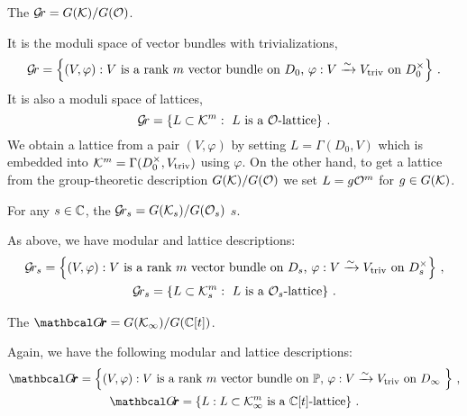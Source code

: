 \documentclass[draft]{article} %
\begin{document}
\begin{definition}
\label{def:gr}
     The  $\mathcal{G}\!r = G(\mathcal K)/G(\mathcal O)$.
\end{definition}    
It is the moduli space of vector bundles with trivializations,
$$
\mathcal{G}\!r = 
    \left\{ 
        (V, \varphi) : \text{$V$ is a rank $m$ vector bundle on $ D_0 $, $\varphi : V \xrightarrow{\sim} V_{\mathrm{triv}} $ on $ D_0^\times $} 
    \right\} \,. 
$$
It is also a moduli space of lattices, 
$$ 
\mathcal{G}\!r = 
    \left\{ L \subset \mathcal K^m : \text{ $L$ is a $\mathcal O$-lattice} \right\}\,.
$$
% 
We obtain a lattice from a pair $ (V,\varphi) $ by setting $ L = \Gamma(D_0, V)$ which is embedded into $ \mathcal K^m = \Gamma(D_0^\times, V_{\mathrm{triv}})$ using $ \varphi$.  
On the other hand, to get a lattice from the group-theoretic description $ G(\mathcal K) / G(\mathcal O) $ we set $ L = g \mathcal O^m$ for $ g \in G(\mathcal K)$.
% 
\begin{definition}
\label{def:grs}
 For any $ s \in \mathbb C $, 
    the  $\mathcal{G}\!r_s = G(\mathcal K_s)/G(\mathcal O_s)$  $ s $. 
\end{definition}    
As above, we have modular and lattice descriptions:
\begin{gather*}
\mathcal{G}\!r_s = 
    \left\{ (
        V, \varphi) : \text{$V$ is a rank $m$ vector bundle on $ D_s $, $\varphi : V \xrightarrow{\sim} V_{\mathrm{triv}} $ on $ D^\times_s $} 
    \right\}\,, \\
\mathcal{G}\!r_s = 
    \left\{ 
        L \subset \mathcal K_s^m : \text{ $L$ is a $\mathcal O_s$-lattice} 
    \right\} \,. 
\end{gather*}
% 
% 
\begin{definition}
\label{def:grth}
The  $\Grth = G(\Kinf)/G(\CC[t])$.
\end{definition}
Again, we have the following modular and lattice descriptions:
\begin{gather*}
\Grth = 
    \left\{ 
        (V, \varphi) : \text{$V$ is a rank $m$ vector bundle on $ \PP $, $\varphi : V \xrightarrow{\sim} \Vtriv $ on $ D_\infty $ } 
    \right\}\,, \\
\Grth = 
    \left\{ 
        L : L \subset  \Kinf^m \text{ is a $\CC[t]$-lattice} 
    \right\}\,.
\end{gather*}
\end{document}
